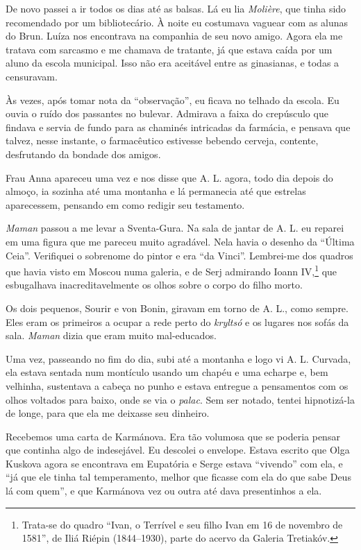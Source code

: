 De novo passei a ir todos os dias até as balsas. Lá eu lia
\emph{Molière}, que tinha sido recomendado por um bibliotecário. À noite
eu costumava vaguear com as alunas do Brun. Luíza nos encontrava na
companhia de seu novo amigo. Agora ela me tratava com sarcasmo e me
chamava de tratante, já que estava caída por um aluno da escola
municipal. Isso não era aceitável entre as ginasianas, e todas a
censuravam.

Às vezes, após tomar nota da ``observação'', eu ficava no telhado da
escola. Eu ouvia o ruído dos passantes no bulevar. Admirava a faixa do
crepúsculo que findava e servia de fundo para as chaminés intricadas da
farmácia, e pensava que talvez, nesse instante, o farmacêutico estivesse
bebendo cerveja, contente, desfrutando da bondade dos amigos.

Frau Anna apareceu uma vez e nos disse que A. L. agora, todo dia depois
do almoço, ia sozinha até uma montanha e lá permanecia até que estrelas
aparecessem, pensando em como redigir seu testamento.

\emph{Maman} passou a me levar a Sventa-Gura. Na sala de jantar de A. L.
eu reparei em uma figura que me pareceu muito agradável. Nela havia o
desenho da ``Última Ceia''. Verifiquei o sobrenome do pintor e era ``da
Vinci''. Lembrei-me dos quadros que havia visto em Moscou numa galeria,
e de Serj admirando Ioann IV,\footnote{Trata-se do quadro ``Ivan, o
  Terrível e seu filho Ivan em 16 de novembro de 1581'', de Iliá Riépin
  (1844--1930), parte do acervo da Galeria Tretiakóv.} que esbugalhava
inacreditavelmente os olhos sobre o corpo do filho morto.

Os dois pequenos, Sourir e von Bonin, giravam em torno de A. L., como
sempre. Eles eram os primeiros a ocupar a rede perto do \emph{kryltsó} e
os lugares nos sofás da sala. \emph{Maman} dizia que eram muito
mal-educados.

Uma vez, passeando no fim do dia, subi até a montanha e logo vi A. L.
Curvada, ela estava sentada num montículo usando um chapéu e uma echarpe
e, bem velhinha, sustentava a cabeça no punho e estava entregue a
pensamentos com os olhos voltados para baixo, onde se via o
\emph{palac}. Sem ser notado, tentei hipnotizá-la de longe, para que ela
me deixasse seu dinheiro.

Recebemos uma carta de Karmánova. Era tão volumosa que se poderia pensar
que continha algo de indesejável. Eu descolei o envelope. Estava escrito
que Olga Kuskova agora se encontrava em Eupatória e Serge estava
``vivendo'' com ela, e ``já que ele tinha tal temperamento, melhor que
ficasse com ela do que sabe Deus lá com quem'', e que Karmánova vez ou
outra até dava presentinhos a ela.


